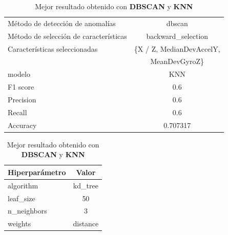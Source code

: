 \begin{appendices}
		\begin{table}[htb]
			\caption{Mejor resultado obtenido con \textbf{DBSCAN} y \textbf{KNN}}
			\label{table:19}
			\centering
			\begin{tabular}{lc}
				\toprule
				      Método de detección de anomalías &                                 dbscan \\
				Método de selección de características &                     backward\_selection \\
				         Características seleccionadas & \{X / Z, MedianDevAccelY,               \\
						 							   &                   MeanDevGyroZ\} \\
				                                modelo &                                    KNN \\
				                              F1 score &                                    0.6 \\
				                             Precision &                                    0.6 \\
				                                Recall &                                    0.6 \\
				                              Accuracy &                               0.707317 \\
				\bottomrule
			\end{tabular}
			\newline
			\newline

			\begin{tabular}{lc}
				\toprule
				Hiperparámetro &    Valor \\
				\midrule
					 algorithm &  kd\_tree \\
					 leaf\_size &       50 \\
				   n\_neighbors &        3 \\
					   weights & distance \\
				\bottomrule
			\end{tabular}
			
			
		\end{table}


\end{appendices}
